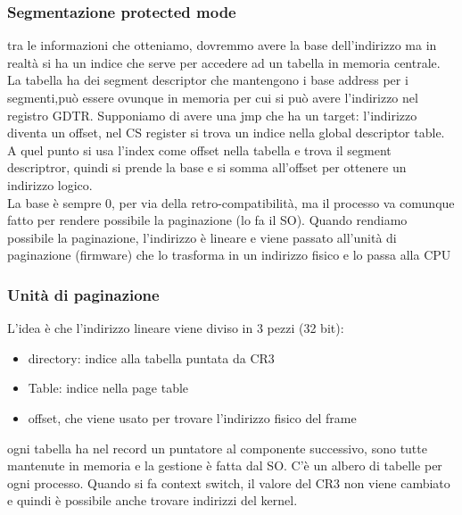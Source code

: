 \documentclass[12pt, oneside]{extbook} %
\begin{document}
\subsubsection{Segmentazione protected mode}
tra le informazioni che otteniamo, dovremmo avere la base dell'indirizzo ma in realtà si ha un indice che serve per accedere ad un tabella in memoria centrale. La tabella ha dei segment descriptor che mantengono i base address per i segmenti,può essere ovunque in memoria per cui si può avere l'indirizzo nel registro GDTR. Supponiamo di avere una jmp che ha un target: l'indirizzo diventa un offset, nel CS register si trova un indice nella global descriptor table. A quel punto si usa l'index come offset nella tabella e trova il segment descriptror, quindi si prende la base e si somma all'offset per ottenere un indirizzo logico.\\ La base è sempre 0, per via della retro-compatibilità, ma il processo va comunque fatto per rendere possibile la paginazione (lo fa il SO). Quando rendiamo possibile la paginazione, l'indirizzo è lineare e viene passato all'unità di paginazione (firmware) che lo trasforma in un indirizzo fisico e lo passa alla CPU
\subsubsection{Unità di paginazione}
L'idea è che l'indirizzo lineare viene diviso in 3 pezzi (32 bit):
\begin{itemize}
\item directory: indice alla tabella puntata da CR3
\item Table: indice nella page table
\item offset, che viene usato per trovare l'indirizzo fisico del frame
\end{itemize}
ogni tabella ha nel record un puntatore al componente successivo, sono tutte mantenute in memoria e la gestione è fatta dal SO. C'è un albero di tabelle per ogni processo. Quando si fa context switch, il valore del CR3 non viene cambiato e quindi è possibile anche trovare indirizzi del kernel.
\end{document}
